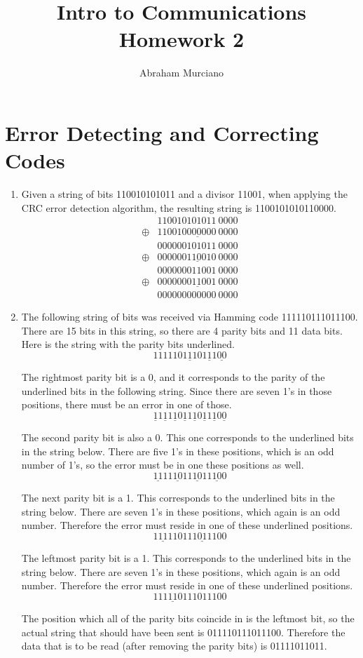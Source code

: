 \documentclass[fleqn]{article}
\title{Intro to Communications \\
\large Homework 2}
\author{Abraham Murciano}
\begin{document}
\maketitle

\section{Error Detecting and Correcting Codes}
\begin{enumerate}[label = Part \arabic*.]
	\item %
	Given a string of bits 110010101011 and a divisor 11001, when applying the CRC error detection algorithm, the resulting string is 1100101010110000.
	\begin{align*}
							&110010101011\ 0000 \\
		\oplus &\underline{	 110010000000\ 0000 } \\
							&000000101011\ 0000 \\
		\oplus &\underline{	 000000110010\ 0000 } \\
							&000000011001\ 0000 \\
		\oplus &\underline{	 000000011001\ 0000 } \\
							&000000000000\ 0000
	\end{align*}

	\item %
	The following string of bits was received via Hamming code 111110111011100. There are 15 bits in this string, so there are 4 parity bits and 11 data bits. Here is the string with the parity bits underlined.
	\[1111101\underline{1}101\underline{1}1\underline{00}\]

	The rightmost parity bit is a 0, and it corresponds to the parity of the underlined bits in the following string. Since there are seven 1's in those positions, there must be an error in one of those.
	\[\underline{1}1\underline{1}1\underline{1}0\underline{1}1\underline{1}0\underline{1}1\underline{1}0\underline{0}\]

	The second parity bit is also a 0. This one corresponds to the underlined bits in the string below. There are five 1's in these positions, which is an odd number of 1's, so the error must be in one these positions as well.
	\[\underline{11}11\underline{10}11\underline{10}11\underline{10}0\]

	The next parity bit is a 1. This corresponds to the underlined bits in the string below. There are seven 1's in these positions, which again is an odd number. Therefore the error must reside in one of these underlined positions.
	\[\underline{1111}1011\underline{1011}100\]

	The leftmost parity bit is a 1. This corresponds to the underlined bits in the string below. There are seven 1's in these positions, which again is an odd number. Therefore the error must reside in one of these underlined positions.
	\[\underline{11111011}1011100\]

	The position which all of the parity bits coincide in is the leftmost bit, so the actual string that should have been sent is 011110111011100. Therefore the data that is to be read (after removing the parity bits) is 01111011011.
\end{enumerate}
\end{document}
